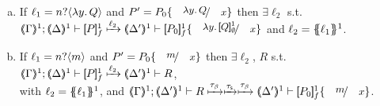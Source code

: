 \documentclass[runningheads]{llncs}
\begin{document}
{{\begin{proposition}
\begin{enumerate}[1.]
\begin{enumerate}[a)]
				\item
					If $\ell_1 = n ? \langle \lambda y.\,Q \rangle$ and
					$P' = P_0 \subst{\abs{y}Q}{x}$
					then $\exists \ell_2$ s.t. \\
					$\horel{\tmap{\Gamma}{1}}{\tmap{\Delta}{1}}{\pmapp{P}{1}{f}}{\hby{\ell_2}}{\tmap{\Delta'}{1}}{\pmapp{P_0}{1}{f}\subst{\abs{y}\pmapp{Q}{1}{\emptyset}}{x}}$
					and $\ell_2 = \{\!\!\{\ell_1\}\!\!\}^{1}$.
			
				\item
					If $\ell_1 = n ? \langle m \rangle$
					and 
					$P' = P_0 \subst{m}{x}$
					then $\exists \ell_2$, $R$ s.t. 
					$\horel{\tmap{\Gamma}{1}}{\tmap{\Delta}{1}}{\pmapp{P}{1}{f}}{\hby{\ell_2}}{\tmap{\Delta'}{1}}{R}$, \\
					with $\ell_2 = \{\!\!\{\ell_1\}\!\!\}^{1}$, 
					and
					$\horel{\tmap{\Gamma}{1}}{\tmap{\Delta'}{1}}{R}{\hby{\btau} \hby{\stau} \hby{\btau}}
					{\tmap{\Delta'}{1}}{\pmapp{P_0}{1}{f}\subst{m}{x}}$.
						
%			
%			
			\end{enumerate}
			

\end{enumerate}
\end{proposition}}}
\end{document}

